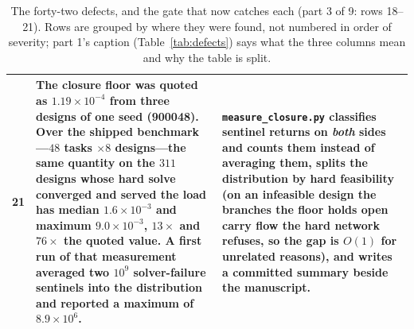\documentclass{article}
\begin{document}
\begin{table}[p]
\begin{tabular}{@{}p{0.6cm}p{7.3cm}p{7.3cm}@{}}
21 & The closure floor was quoted as $1.19\times10^{-4}$ from three designs of one seed (900048).  Over the shipped benchmark---$48$ tasks $\times 8$ designs---the same quantity on the $311$ designs whose hard solve converged and served the load has median $1.6\times10^{-3}$ and maximum $9.0\times10^{-3}$, $13\times$ and $76\times$ the quoted value.  A first run of that measurement averaged two $10^9$ solver-failure sentinels into the distribution and reported a maximum of $8.9\times10^{6}$. & \texttt{measure\_closure.py} classifies sentinel returns on \emph{both} sides and counts them instead of averaging them, splits the distribution by hard feasibility (on an infeasible design the branches the floor holds open carry flow the hard network refuses, so the gap is $O(1)$ for unrelated reasons), and writes a committed summary beside the manuscript. \\
\bottomrule
\end{tabular}
\caption{The forty-two defects, and the gate that now catches each (part 3 of 9: rows 18--21).  Rows are grouped by where they were found, not numbered in order of severity; part 1's caption (Table~\ref{tab:defects}) says what the three columns mean and why the table is split.}
\label{tab:defectsc}
\end{table}
\end{document}
